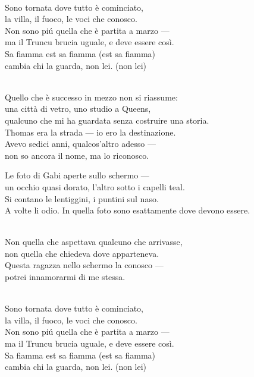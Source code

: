 \begin{lyrics}
\\
Sono tornata dove tutto è cominciato,\\
la villa, il fuoco, le voci che conosco.\\
Non sono piú quella che è partita a marzo —\\
ma il Truncu brucia uguale, e deve essere così.
\\
Sa fiamma est sa fiamma (est sa fiamma)\\
cambia chi la guarda, non lei. (non lei)

\\
Quello che è successo in mezzo non si riassume:\\
una città di vetro, uno studio a Queens,\\
qualcuno che mi ha guardata senza costruire una storia.\\
Thomas era la strada — io ero la destinazione.\\
Avevo sedici anni, qualcos'altro adesso —
\\
non so ancora il nome, ma lo riconosco.

Le foto di Gabi aperte sullo schermo —\\
un occhio quasi dorato, l'altro sotto i capelli teal.\\
Si contano le lentiggini, i puntini sul naso.
\\
A volte li odio. In quella foto sono esattamente dove devono essere.

\\
Non quella che aspettava qualcuno che arrivasse,\\
non quella che chiedeva dove apparteneva.\\
Questa ragazza nello schermo la conosco —\\
potrei innamorarmi di me stessa.

\\
Sono tornata dove tutto è cominciato,\\
la villa, il fuoco, le voci che conosco.\\
Non sono piú quella che è partita a marzo —\\
ma il Truncu brucia uguale, e deve essere così.
\\
Sa fiamma est sa fiamma (est sa fiamma)\\
cambia chi la guarda, non lei. (non lei)


\end{lyrics}
